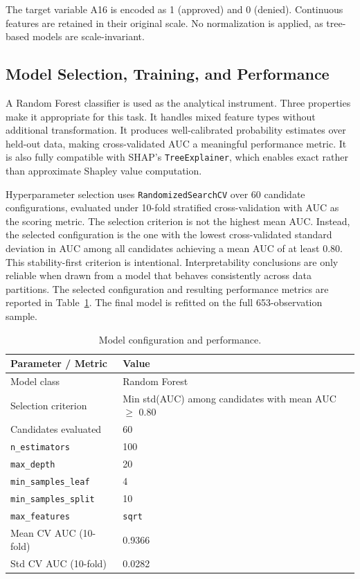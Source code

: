 \documentclass[11pt]{article}
\newcommand{\rowhead}{\rowcolor{NavyReport!15}}
\newcommand{\rowalt}{\rowcolor{LightGray}}
\begin{document}
The target variable A16 is encoded as 1 (approved) and 0 (denied). Continuous features are retained in their original scale. No normalization is applied, as tree-based models are scale-invariant.

\subsection{Model Selection, Training, and Performance}

A Random Forest classifier is used as the analytical instrument. Three properties make it appropriate for this task. It handles mixed feature types without additional transformation. It produces well-calibrated probability estimates over held-out data, making cross-validated AUC a meaningful performance metric. It is also fully compatible with SHAP's \texttt{TreeExplainer}, which enables exact rather than approximate Shapley value computation.

Hyperparameter selection uses \texttt{RandomizedSearchCV} over 60 candidate configurations, evaluated under 10-fold stratified cross-validation with AUC as the scoring metric. The selection criterion is not the highest mean AUC. Instead, the selected configuration is the one with the lowest cross-validated standard deviation in AUC among all candidates achieving a mean AUC of at least 0.80. This stability-first criterion is intentional. Interpretability conclusions are only reliable when drawn from a model that behaves consistently across data partitions. The selected configuration and resulting performance metrics are reported in Table~\ref{tab:model}. The final model is refitted on the full 653-observation sample.

\begin{table}[H]
\centering
\caption{Model configuration and performance.}
\label{tab:model}
\setlength{\arrayrulewidth}{0.4pt}
\begin{tabular}{ll}
\toprule
\rowhead
\color{white}\textbf{Parameter / Metric} & \color{white}\textbf{Value} \\
\midrule
Model class                  & Random Forest \\
\rowalt
Selection criterion          & Min std(AUC) among candidates with mean AUC $\geq$ 0.80 \\
Candidates evaluated         & 60 \\
\rowalt
\texttt{n\_estimators}       & 100 \\
\texttt{max\_depth}          & 20 \\
\rowalt
\texttt{min\_samples\_leaf}  & 4 \\
\texttt{min\_samples\_split} & 10 \\
\rowalt
\texttt{max\_features}       & \texttt{sqrt} \\
Mean CV AUC (10-fold)        & 0.9366 \\
\rowalt
Std CV AUC (10-fold)         & 0.0282 \\
\bottomrule
\end{tabular}
\end{table}
\end{document}
